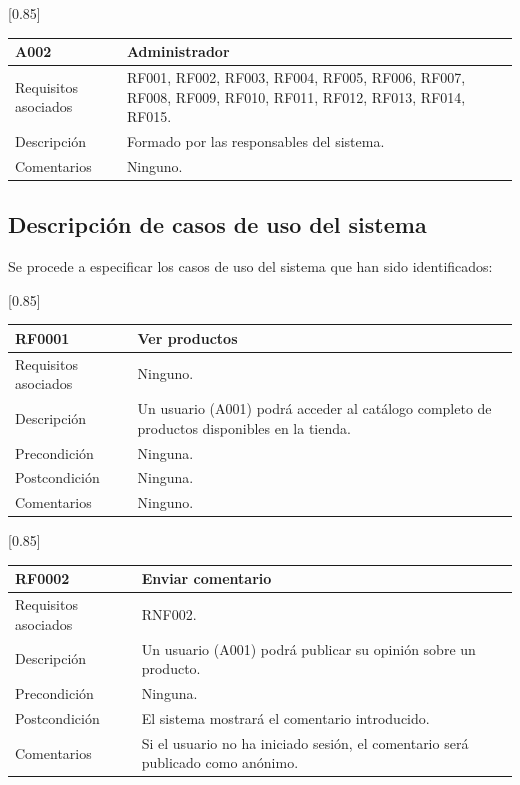 \begin{table}[!htbp]
  \centering
  \scalebox{0.85}[0.85] {
    \begin{tabular}{l p{32.145em}}
    \toprule
    \textbf{A002} & \textbf{Administrador} \\
    \midrule
    Requisitos asociados & RF001, RF002, RF003, RF004, RF005, RF006, RF007, RF008, RF009, RF010, RF011, RF012, RF013, RF014, RF015. \\
    Descripción & Formado por las responsables del sistema. \\
    Comentarios & Ninguno. \\
    \midrule
    \end{tabular}%
  }
  \label{tab:a002}
\end{table}%

\subsection{Descripción de casos de uso del sistema}

Se procede a especificar los casos de uso del sistema que han sido identificados:

\begin{table}[htbp]
  \centering
  \scalebox{0.85}[0.85] {
    \begin{tabular}{l p{32.145em}}
    \toprule
    \textbf{RF0001} & \textbf{Ver productos} \\
    \midrule
    Requisitos asociados & Ninguno. \\
    Descripción & Un usuario (A001) podrá acceder al catálogo completo de productos disponibles en la tienda. \\
    Precondición & Ninguna. \\
    Postcondición & Ninguna.\\
    Comentarios & Ninguno. \\
    \midrule
    \end{tabular}%
  }
  \label{tab:rf001}
\end{table}%

\begin{table}[!htbp]
  \centering
    \scalebox{0.85}[0.85] {
    \begin{tabular}{l p{32.145em}}
    \toprule
    \textbf{RF0002} & \textbf{Enviar comentario} \\
    \midrule
    Requisitos asociados & RNF002. \\
    Descripción & Un usuario (A001) podrá publicar su opinión sobre un producto. \\
    Precondición & Ninguna. \\
    Postcondición & El sistema mostrará el comentario introducido.\\
    Comentarios & Si el usuario no ha iniciado sesión, el comentario será publicado como anónimo. \\
    \midrule
    \end{tabular}%
  }
  \label{tab:rf002}
\end{table}%

